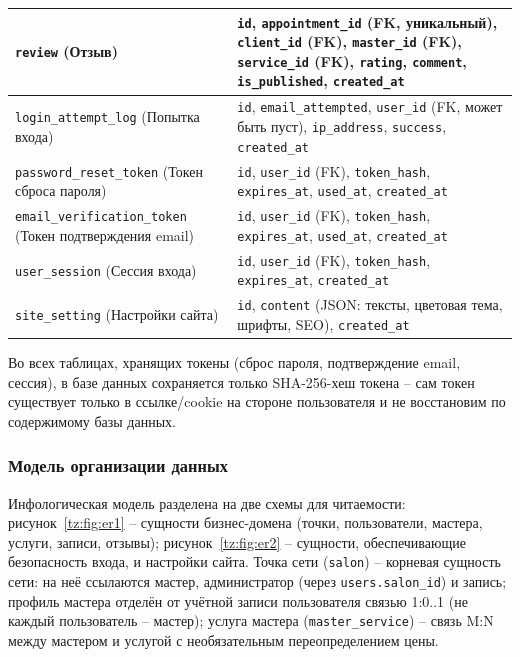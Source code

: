 \begin{xltabular}{\textwidth}{|p{4.2cm}|X|}
\texttt{review} (Отзыв) & \texttt{id}, \texttt{appointment\_id} (FK, уникальный), \texttt{client\_id} (FK), \texttt{master\_id} (FK), \texttt{service\_id} (FK), \texttt{rating}, \texttt{comment}, \texttt{is\_published}, \texttt{created\_at} \\\hline
\texttt{login\_attempt\_log} (Попытка входа) & \texttt{id}, \texttt{email\_attempted}, \texttt{user\_id} (FK, может быть пуст), \texttt{ip\_address}, \texttt{success}, \texttt{created\_at} \\\hline
\texttt{password\_reset\_token} (Токен сброса пароля) & \texttt{id}, \texttt{user\_id} (FK), \texttt{token\_hash}, \texttt{expires\_at}, \texttt{used\_at}, \texttt{created\_at} \\\hline
\texttt{email\_verification\_token} (Токен подтверждения email) & \texttt{id}, \texttt{user\_id} (FK), \texttt{token\_hash}, \texttt{expires\_at}, \texttt{used\_at}, \texttt{created\_at} \\\hline
\texttt{user\_session} (Сессия входа) & \texttt{id}, \texttt{user\_id} (FK), \texttt{token\_hash}, \texttt{expires\_at}, \texttt{created\_at} \\\hline
\texttt{site\_setting} (Настройки сайта) & \texttt{id}, \texttt{content} (JSON: тексты, цветовая тема, шрифты, SEO), \texttt{created\_at} \\\hline
\end{xltabular}

Во всех таблицах, хранящих токены (сброс пароля, подтверждение email, сессия), в базе данных сохраняется только SHA-256-хеш токена -- сам токен существует только в ссылке/cookie на стороне пользователя и не восстановим по содержимому базы данных.

\subsubsection{Модель организации данных}

Инфологическая модель разделена на две схемы для читаемости: рисунок~\ref{tz:fig:er1} -- сущности бизнес-домена (точки, пользователи, мастера, услуги, записи, отзывы); рисунок~\ref{tz:fig:er2} -- сущности, обеспечивающие безопасность входа, и настройки сайта. Точка сети (\texttt{salon}) -- корневая сущность сети: на неё ссылаются мастер, администратор (через \texttt{users.salon\_id}) и запись; профиль мастера отделён от учётной записи пользователя связью 1:0..1 (не каждый пользователь -- мастер); услуга мастера (\texttt{master\_service}) -- связь M:N между мастером и услугой с необязательным переопределением цены.

